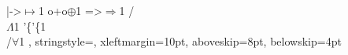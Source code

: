 {  {|->}{{$\mapsto$}}1 {o+o}{{$\oplus$}}1 {=>}{{$\Rightarrow$}}1
  {/\\}{{$\Lambda$}}1  {'\{}{'\{}1 {\\/}{{$\forall$}}1 %
  ,
  stringstyle=\color{grayred},     %
  xleftmargin=10pt,
  aboveskip=8pt,
  belowskip=4pt
}

\newcommand{\code}[1]{\lstinline[mathescape]|#1|}
\newcommand{\hcode}[1]{{\color{darkblue} \lstinline[keywordstyle={}]|#1|}} %
\newcommand{\hfcode}[1]{{\color{darkblue} \lstinline[keywordstyle={},basicstyle=\footnotesize\ttfamily]|#1|}} %
